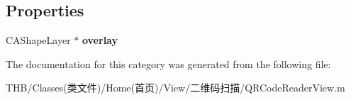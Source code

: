 \subsection*{Properties}
\begin{DoxyCompactItemize}
\item 
\mbox{\label{category_q_r_code_reader_view_07_08_a5c189a26d400492b96d18460bdb8d3a3}} 
C\+A\+Shape\+Layer $\ast$ {\bfseries overlay}
\end{DoxyCompactItemize}


The documentation for this category was generated from the following file\+:\begin{DoxyCompactItemize}
\item 
T\+H\+B/\+Classes(类文件)/\+Home(首页)/\+View/二维码扫描/Q\+R\+Code\+Reader\+View.\+m\end{DoxyCompactItemize}

